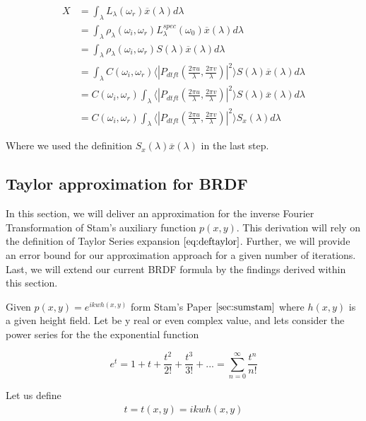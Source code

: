 \begin{align}
X 
& =\int_{\lambda}L_\lambda(\omega_r)\overline{x}(\lambda)d\lambda \nonumber \\
& =\int_{\lambda}\rho_\lambda(\omega_i,\omega_r)L_\lambda^{spec}(\omega_0) \overline{x}(\lambda)d\lambda \nonumber \\
& =\int_{\lambda}\rho_\lambda(\omega_i,\omega_r) S(\lambda) \overline{x}(\lambda)d\lambda \nonumber \\
& =\int_{\lambda} C(\omega_i,\omega_r) \langle \left|P_{dtft}(\frac{2\pi u}{\lambda}, \frac{2\pi v}{\lambda})\right|^2\rangle S(\lambda) \overline{x}(\lambda)d\lambda \nonumber \\
& = C(\omega_i,\omega_r) \int_{\lambda} \langle \left|P_{dtft}(\frac{2\pi u}{\lambda}, \frac{2\pi v}{\lambda})\right|^2\rangle S(\lambda) \overline{x}(\lambda)d\lambda \nonumber \\
& = C(\omega_i,\omega_r) \int_{\lambda} \langle \left|P_{dtft}(\frac{2\pi u}{\lambda}, \frac{2\pi v}{\lambda})\right|^2\rangle S_x(\lambda)d\lambda
\end{align}

Where we used the definition $S_x(\lambda)\overline{x}(\lambda)$ in the last step.

\subsection{Taylor approximation for BRDF}
\label{sec:taylorapproximation}
In this section, we will deliver an approximation for the inverse Fourier Transformation of Stam's auxiliary function $p(x,y)$. This derivation will rely on the definition of Taylor Series expansion $\ref{eq:deftaylor}$. Further, we will provide an error bound for our approximation approach for a given number of iterations. Last, we will extend our current BRDF formula by the findings derived within this section.

Given $p(x,y)=e^{ikwh(x,y)}$ form Stam's Paper $\ref{sec:sumstam}$ where $h(x,y)$ is a given height field. Let be y real or even complex value, and lets consider the power series for the the exponential function
 
\begin{equation}
  e^{t}=1+t+\frac{t^{2}}{2!}+\frac{t^{3}}{3!}+...=\sum_{n=0}^{\infty}\frac{t^{n}}{n!}
\end{equation}

Let us define 
\begin{align}
t 
= t(x,y) 
= ikwh(x,y)
\end{align}
 
